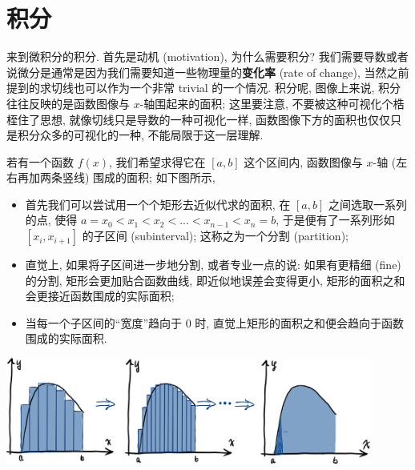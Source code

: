 \section{积分}\label{017}

来到微积分的积分. 首先是动机 (motivation), 为什么需要积分?
我们需要导数或者说微分是通常是因为我们需要知道一些物理量的\textbf{变化率}
(rate of change), 当然之前提到的求切线也可以作为一个非常 trivial
的一个情况. 积分呢, 图像上来说, 积分往往反映的是函数图像与
$x$-轴围起来的面积; 这里要注意, 不要被这种可视化个梏桎住了思想,
就像切线只是导数的一种可视化一样,
函数图像下方的面积也仅仅只是积分众多的可视化的一种,
不能局限于这一层理解.

\begin{tcolorbox}[size=fbox, breakable, enhanced jigsaw, title={积分 (integration)}]

若有一个函数 $f(x)$, 我们希望求得它在 $[a,b]$ 这个区间内, 函数图像与
$x$-轴 (左右再加两条竖线) 围成的面积; 如下图所示,

\begin{itemize}
\item
  首先我们可以尝试用一个个矩形去近似代求的面积, 在 $[a,b]$
  之间选取一系列的点, 使得 $a=x_0<x_1<x_2<...<x_{n-1}<x_{n}=b$,
  于是便有了一系列形如 $[x_i,x_{i+1}]$ 的子区间 (subinterval);
  这称之为一个分割 (partition);
\item
  直觉上, 如果将子区间进一步地分割, 或者专业一点的说: 如果有更精细
  (fine) 的分割, 矩形会更加贴合函数曲线, 即近似地误差会变得更小,
  矩形的面积之和会更接近函数围成的实际面积;
\item
  当每一个子区间的``宽度''趋向于 $0$ 时,
  直觉上矩形的面积之和便会趋向于函数围成的实际面积.
\end{itemize}


\begin{tcolorbox}[size=fbox, breakable, enhanced jigsaw]
\includegraphics[width=0.9\textwidth]{img/image-20230906163643414.png}

\end{tcolorbox}


\end{tcolorbox}
